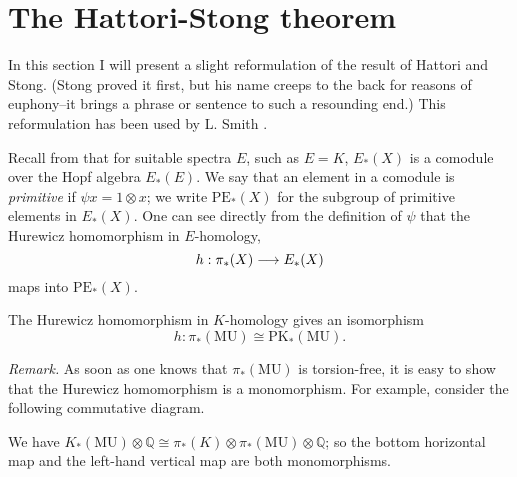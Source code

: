 \documentclass[../main]{subfiles}
\begin{document}
\label{sec:p2c14}

\chapter{The Hattori-Stong theorem}

In this section I will present a slight reformulation of the result
of Hattori and Stong. (Stong proved it first, but his name creeps to the
back for reasons of euphony--it brings a phrase or sentence to such a
resounding end.) This reformulation has been used by L. Smith \cite{smith}. 

Recall from \cite[Lecture 3]{adams3} that for suitable spectra $E$, such as $E=K$, $E_\ast(X)$ is a comodule over the Hopf algebra $E_\ast(E)$. We say that an element in a comodule is \emph{primitive} if $\psi x = 1\otimes x$; we write $\mathrm{PE}_\ast(X)$ for the subgroup of primitive elements in $E_\ast(X)$. One can see directly from the definition of $\psi$ that the Hurewicz homomorphism in $E$-homology, $$h:\pi_\ast(X)\longrightarrow E_\ast(X)$$ maps into $\mathrm{PE}_\ast(X)$. 
\begin{theorem}
\label{thm:p2c14.1}
The Hurewicz homomorphism in $K$-homology gives an isomorphism $$h:\pi_\ast(\mathrm{MU})\cong\mathrm{PK}_\ast(\mathrm{MU}).$$
\end{theorem}
\emph{Remark.} As soon as one knows that $\pi_\ast(\mathrm{MU})$ is torsion-free, it is easy to show that the Hurewicz homomorphism is a monomorphism. For example, consider the following commutative diagram.
\begin{center}
\end{center}
We have $K_\ast(\mathrm{MU})\otimes\mathbb{Q}\cong\pi_\ast(K)\otimes\pi_\ast(\mathrm{MU})\otimes\mathbb{Q}$; so the bottom horizontal map and the left-hand vertical map are both monomorphisms.
\end{document}
